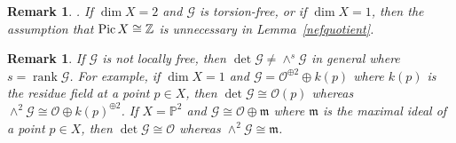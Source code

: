\documentclass[a4paper,12pt]{amsart}
\newtheorem{rmk}[thm]{Remark}%
\newcommand{\Pic}{\mathop{\rm Pic}\nolimits}
\DeclareMathOperator{\rk}{rank}
\begin{document}
\begin{rmk}\label{rmk6.6}.
If $\dim X=2$ and $\mathcal{G}$ is torsion-free,  or if $\dim X=1$,
then the assumption that $\Pic X\cong \mathbb{Z}$
is unnecessary in Lemma~\ref{nefquotient}.
\end{rmk}

\begin{rmk}
If $\mathcal{G}$ is not locally free, then $\det\mathcal{G}\neq \wedge^s\mathcal{G}$ in general
where $s=\rk \mathcal{G}$.
For example, if $\dim X=1$ and $\mathcal{G}=\mathcal{O}^{\oplus 2}\oplus k(p)$
where $k(p)$ is the residue field at a point $p\in X$, then $\det\mathcal{G}\cong \mathcal{O}(p)$
whereas $\wedge^2\mathcal{G}\cong \mathcal{O}\oplus k(p)^{\oplus 2}$.
If $X=\mathbb{P}^2$ and $\mathcal{G}\cong \mathcal{O}\oplus \mathfrak{m}$
where $\mathfrak{m}$ is the maximal ideal of a point $p\in X$,
then $\det\mathcal{G}\cong \mathcal{O}$
whereas $\wedge^2\mathcal{G}\cong \mathfrak{m}$.
\end{rmk}
\end{document}
